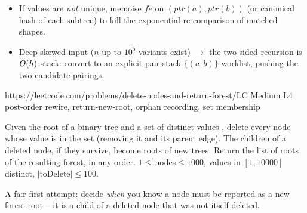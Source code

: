 \begin{hardeningbox}
\begin{itemize}[nosep, leftmargin=1.4em]
  \item If values are \emph{not} unique, memoise $\mathit{fe}$ on
        $(\mathit{ptr}(a),\mathit{ptr}(b))$ (or canonical hash of each subtree) to
        kill the exponential re-comparison of matched shapes.
  \item Deep skewed input ($n$ up to $10^{5}$ variants exist) $\to$ the two-sided
        recursion is $O(h)$ stack: convert to an explicit pair-stack
        $\{(a,b)\}$ worklist, pushing the two candidate pairings.
\end{itemize}
\end{hardeningbox}

  {https://leetcode.com/problems/delete-nodes-and-return-forest/}{LC Medium L4}
  {post-order rewire, return-new-root, orphan recording, set membership}

\begin{problemstatement}
Given the root of a binary tree and a set of distinct values ,
delete every node whose value is in the set (removing it and its parent edge). The
children of a deleted node, if they survive, become roots of new trees. Return the
list of roots of the resulting forest, in any order. $1\le$\,nodes$\le1000$,
values in $[1,10000]$ distinct, $|\text{toDelete}|\le100$.
\end{problemstatement}

\begin{attemptgate}
A fair first attempt: decide \emph{when} you know a node must be reported as a new
forest root -- it is a child of a deleted node that was not itself deleted.
\end{attemptgate}

